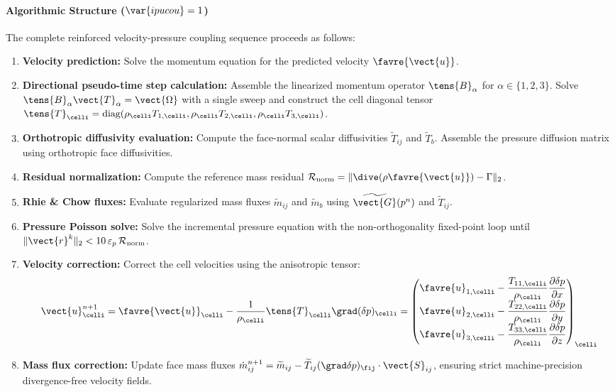 \paragraph{Algorithmic Structure ($\var{ipucou} = 1$)}
The complete reinforced velocity-pressure coupling sequence proceeds as follows:
\begin{enumerate}
\item \textbf{Velocity prediction:}
  Solve the momentum equation for the predicted velocity $\favre{\vect{u}}$.
\item \textbf{Directional pseudo-time step calculation:}
  Assemble the linearized momentum operator $\tens{B}_\alpha$ for $\alpha \in \{1, 2, 3\}$.
  Solve $\tens{B}_\alpha \vect{T}_\alpha = \vect{\Omega}$ with a single sweep
  and construct the cell diagonal tensor $\tens{T}_\celli = \text{diag}(\rho_\celli T_{1,\celli}, \rho_\celli T_{2,\celli}, \rho_\celli T_{3,\celli})$.
\item \textbf{Orthotropic diffusivity evaluation:}
  Compute the face-normal scalar diffusivities $\widetilde{T}_{ij}$ and $\widetilde{T}_b$.
  Assemble the pressure diffusion matrix using orthotropic face diffusivities.
\item \textbf{Residual normalization:}
  Compute the reference mass residual $\mathcal{R}_{\text{norm}} = \| \dive(\rho \favre{\vect{u}}) - \Gamma \|_2$.
\item \textbf{Rhie \& Chow fluxes:}
  Evaluate regularized mass fluxes $\widetilde{m}_{ij}$ and $\widetilde{m}_b$ using
  $\widetilde{\vect{G}}(p^n)$ and $\widetilde{T}_{ij}$.
\item \textbf{Pressure Poisson solve:}
  Solve the incremental pressure equation with the non-orthogonality fixed-point loop
  until $\| \vect{r}^k \|_2 < 10 \, \varepsilon_p \, \mathcal{R}_{\text{norm}}$.
\item \textbf{Velocity correction:}
  Correct the cell velocities using the anisotropic tensor:
  \begin{equation}
    \vect{u}_\celli^{n+1} = \favre{\vect{u}}_\celli - \frac{1}{\rho_\celli} \tens{T}_\celli \grad(\delta p)_\celli
    = \begin{pmatrix}
      \favre{u}_{1,\celli} - \dfrac{T_{11,\celli}}{\rho_\celli} \dfrac{\partial \delta p}{\partial x} \\[6pt]
      \favre{u}_{2,\celli} - \dfrac{T_{22,\celli}}{\rho_\celli} \dfrac{\partial \delta p}{\partial y} \\[6pt]
      \favre{u}_{3,\celli} - \dfrac{T_{33,\celli}}{\rho_\celli} \dfrac{\partial \delta p}{\partial z}
    \end{pmatrix}_\celli
  \end{equation}
\item \textbf{Mass flux correction:}
  Update face mass fluxes $\dot{m}_{ij}^{n+1} = \widetilde{m}_{ij} - \widetilde{T}_{ij} (\grad \delta p)_{\fij} \cdot \vect{S}_{ij}$,
  ensuring strict machine-precision divergence-free velocity fields.
\end{enumerate}



